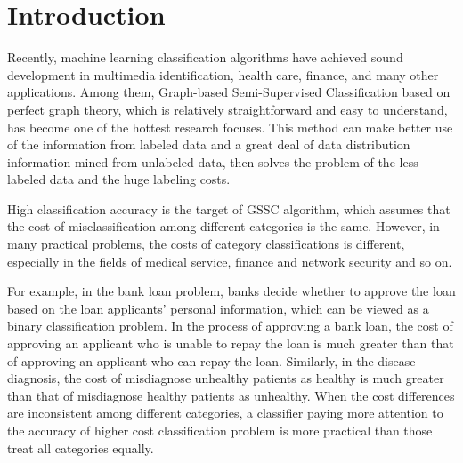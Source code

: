 \documentclass{svjour3}                     %
\begin{document}
\section{Introduction}
\label{intro}


Recently, machine learning classification algorithms have achieved sound development in multimedia identification, health care, finance, and many other applications. Among them, Graph-based Semi-Supervised Classification based on perfect graph theory, which is relatively straightforward and easy to understand, has become one of the hottest research focuses. This method can make better use of the information from labeled data and a great deal of data distribution information mined from unlabeled data, then solves the problem of the less labeled data and the huge labeling costs.

High classification accuracy is the target of GSSC algorithm, which assumes that the cost of misclassification among different categories is the same. However, in many practical problems,  the costs of category classifications is different, especially in the fields of medical service, finance and network security and so on.

For example, in the bank loan problem, banks decide whether to approve the loan based on the loan applicants' personal information, which can be viewed as a binary classification problem. In the process of approving a bank loan, the cost of approving an applicant who is unable to repay the loan is much greater than that of approving an applicant who can repay the loan. Similarly, in the disease diagnosis, the cost of misdiagnose unhealthy patients as healthy is much greater than that of misdiagnose healthy patients as unhealthy. When the cost differences are inconsistent among different categories, a classifier paying more attention to the accuracy of higher cost classification problem is more practical than those treat all categories equally.
\end{document}
